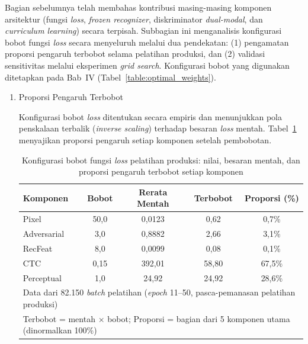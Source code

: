 \documentclass[12pt,a4paper]{article}
\begin{document}
Bagian sebelumnya telah membahas kontribusi masing-masing komponen arsitektur (fungsi \textit{loss}, \textit{frozen recognizer}, diskriminator \textit{dual-modal}, dan \textit{curriculum learning}) secara terpisah. Subbagian ini menganalisis konfigurasi bobot fungsi \textit{loss} secara menyeluruh melalui dua pendekatan: (1) pengamatan proporsi pengaruh terbobot selama pelatihan produksi, dan (2) validasi sensitivitas melalui eksperimen \textit{grid search}. Konfigurasi bobot yang digunakan ditetapkan pada Bab~IV (Tabel~\ref{table:optimal_weights}).

\begin{enumerate}[leftmargin=1.5em, labelsep=0.5em, itemindent=0pt, label=\arabic*., topsep=0pt, partopsep=0pt]
    \item Proporsi Pengaruh Terbobot
    
    Konfigurasi bobot \textit{loss} ditentukan secara empiris dan menunjukkan pola penskalaan terbalik (\textit{inverse scaling}) terhadap besaran \textit{loss} mentah. Tabel~\ref{tab:loss-weights-config} menyajikan proporsi pengaruh setiap komponen setelah pembobotan.

    \begin{table}[!htbp]
        \caption[Konfigurasi bobot \textit{loss} produksi]{Konfigurasi bobot fungsi \textit{loss} pelatihan produksi: nilai, besaran mentah, dan proporsi pengaruh terbobot setiap komponen}
        \label{tab:loss-weights-config}
        \normalsize
        \begin{tabular*}{\textwidth}{@{\extracolsep{\fill}}lcccc@{}}
            \hline
            \textbf{Komponen}    & \textbf{Bobot} & \textbf{Rerata Mentah} & \textbf{Terbobot} & \textbf{Proporsi (\%)}   \\
            \hline
            Pixel       & 50,0  & 0,0123     & 0,62       & 0,7\%   \\
            Adversarial & 3,0   & 0,8882     & 2,66       & 3,1\%   \\
            RecFeat     & 8,0   & 0,0099     & 0,08       & 0,1\%   \\
            CTC         & 0,15  & 392,01     & 58,80      & 67,5\%  \\
            Perceptual  & 1,0   & 24,92      & 24,92      & 28,6\%  \\
            \hline
            \multicolumn{5}{l}{\small Data dari 82.150 \textit{batch} pelatihan (\textit{epoch} 11--50, pasca-pemanasan pelatihan produksi)}   \\
            \multicolumn{5}{l}{\small Terbobot = mentah $\times$ bobot; Proporsi = bagian dari 5 komponen utama (dinormalkan 100\%)} \\
        \end{tabular*}
    \end{table}


\end{enumerate}
\end{document}
